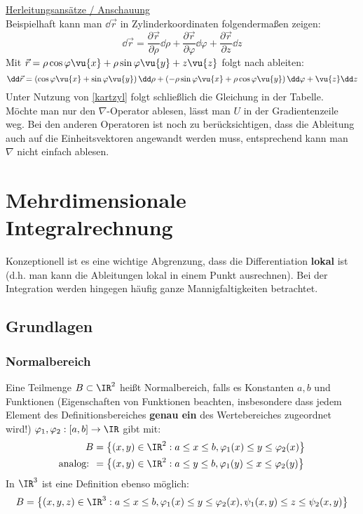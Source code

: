 	  \href{http://groolfs.de/Verschiedenespdf/VektorfeldPolarkoordinaten.pdf}{Herleitungsansätze / Anschauung}\\
	  Beispielhaft kann man $\dd \vec{r}$ in Zylinderkoordinaten folgendermaßen zeigen:
	  $$
\dd \vec{r}=\frac{\partial \vec{r}}{\partial \rho}\dd \rho+\frac{\partial \vec{r}}{\partial \varphi}\dd \varphi+\frac{\partial \vec{r}}{\partial z}\dd z
		$$
		Mit $\vec{r}=\rho\cos\varphi\vu{x}+\rho\sin\varphi\vu{y}+z\vu{z}$ folgt nach ableiten:
		$$
		\dd \vec{r}=\left(\cos\varphi\vu{x}+\sin\varphi\vu{y}\right)\dd \rho+\left(-\rho\sin\varphi\vu{x}+\rho\cos\varphi\vu{y}\right)\dd \varphi+\vu{z}\dd z
		$$
		Unter Nutzung von \ref{kartzyl} folgt schließlich die Gleichung in der Tabelle.\\
		Möchte man nur den $\nabla$-Operator ablesen, lässt man $U$ in der Gradientenzeile weg. Bei den anderen Operatoren ist noch zu berücksichtigen, dass die Ableitung auch auf die Einheitsvektoren angewandt werden muss, entsprechend kann man $\nabla$ nicht einfach ablesen.
 \section{Mehrdimensionale Integralrechnung}
 Konzeptionell ist es eine wichtige Abgrenzung, dass die Differentiation \textbf{lokal} ist (d.h. man kann die Ableitungen lokal in einem Punkt ausrechnen). Bei der Integration werden hingegen häufig ganze Mannigfaltigkeiten betrachtet. 
 \subsection{Grundlagen}
 \subsubsection{Normalbereich}
 Eine Teilmenge $B\subset\IR^2$ heißt Normalbereich, falls es Konstanten $a,b$ und Funktionen (Eigenschaften von Funktionen beachten, insbesondere dass jedem Element des Definitionsbereiches \textbf{genau ein} des Wertebereiches zugeordnet wird!) $\varphi_1,\varphi_2:[a,b]\to \IR$ gibt mit: 
 \begin{equation*}
 	\begin{split}
 	B&=\left\{(x,y)\in\IR^2:a\leq x\leq b, \varphi_1(x)\leq y \leq\varphi_2(x)\right\} \\ \text{analog: }&=\left\{(x,y)\in\IR^2:a\leq y\leq b, \varphi_1(y)\leq x \leq\varphi_2(y)\right\}
 	\end{split}
 \end{equation*}
 In $\IR^3$ ist eine Definition ebenso möglich:
 \begin{equation*}
 	B=\left\{(x,y,z)\in\IR^3:a\leq x\leq b, \varphi_1(x)\leq y \leq\varphi_2(x), \psi_1(x,y)\leq z \leq \psi_2(x,y)\right\}
 \end{equation*}
